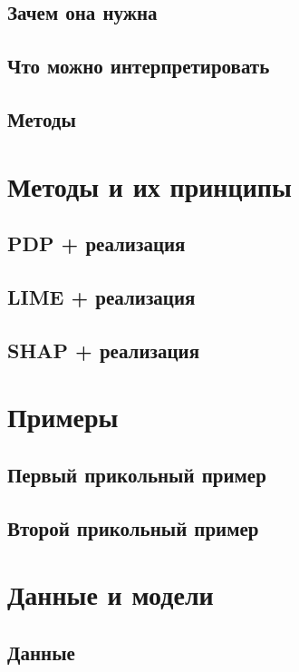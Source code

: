 \documentclass[a4paper, 12pt]{article}
\begin{document}
	\subsection{Зачем она нужна}
		
	\subsection{Что можно интерпретировать}
	
	\subsection{Методы}
	
	\newpage
	
	\section{Методы и их принципы}
	\subsection{PDP + реализация}
	
	\subsection{LIME + реализация}
	
	\subsection{SHAP + реализация}
	
	\newpage

	\section{Примеры}
	\subsection{Первый прикольный пример}
	
	\subsection{Второй прикольный пример}
	
	\newpage

	\section{Данные и модели}
	
	\subsection{Данные}
	
\end{document}
